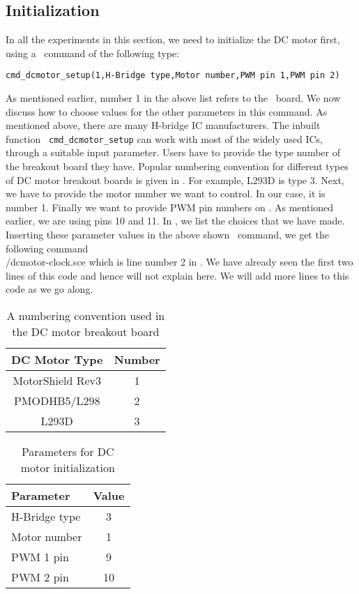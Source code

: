 \subsection{Initialization}
In all the experiments in this section, we need to initialize the DC
motor first, using a \scilab\ command of the following type:

\begin{lstlisting}[style=nonumbers]
  cmd_dcmotor_setup(1,H-Bridge type,Motor number,PWM pin 1,PWM pin 2)
\end{lstlisting}
As mentioned earlier, number 1 in the above list refers to the
\arduino\ board.  We now discuss how to choose values for the other
parameters in this command.  As mentioned above, there are many
H-bridge IC manufacturers.  The inbuilt function {\tt
  cmd\_dcmotor\_setup} can work with most of the widely used ICs,
through a suitable input parameter.  Users have to provide the type
number of the breakout board they have.  Popular numbering convention
for different types of DC motor breakout boards is given in
.  For example, L293D is type 3.  Next, we
have to provide the motor number we want to control.  In our case, it
is number 1.  Finally we want to provide PWM pin numbers on \arduino.
As mentioned earlier, we are using pins 10 and 11.  In
, we list the choices that we have made.
Inserting these parameter values in the above shown \scilab\ command,
we get the following command \\

{\LocDCMscicode/dcmotor-clock.sce}
which is line number 2 in .  We have already
seen 
the first two lines of this code and hence will not explain here.  We
will add more lines to this code as we go along.

\begin{table}
\centering
\caption{A numbering convention used in the DC motor breakout board}
\label{table:convention}
\begin{tabular}{|c|c|}\hline
DC Motor Type & Number \\ \hline
MotorShield Rev3 & 1 \\
PMODHB5/L298 & 2 \\
L293D & 3 \\ \hline
\end{tabular}
\end{table}
\begin{table}
\centering
\caption{Parameters for DC motor initialization}
\label{tab:dcmotor-init}
\begin{tabular}{|l|c|} \hline
Parameter & Value \\ \hline
H-Bridge type & 3 \\ 
Motor number & 1 \\
PWM 1 pin & 9 \\
PWM 2 pin & 10 \\ \hline
\end{tabular}
\end{table}

